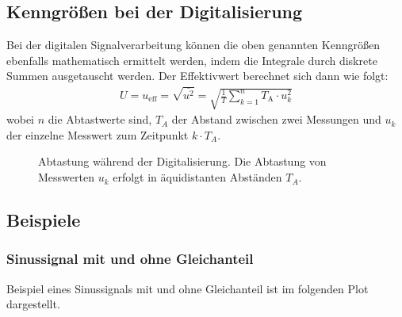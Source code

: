 \documentclass[letterpaper,10pt,english]{jupyterBook}
\let\sphinxpxdimen\pdfpxdimen\else\newdimen\sphinxpxdimen
\begin{document}
\subsection{Kenngrößen bei der Digitalisierung}
\label{\detokenize{content/3_Kenngroessen:kenngroszen-bei-der-digitalisierung}}
\sphinxAtStartPar
Bei der digitalen Signalverarbeitung können die oben genannten Kenngrößen ebenfalls mathematisch ermittelt werden, indem die Integrale durch diskrete Summen ausgetauscht werden. Der Effektivwert berechnet sich dann wie folgt:
\begin{equation*}
\begin{split}U = u_\mathrm{eff} = \sqrt{\overline{u^2}} = \sqrt{\frac{1}{T}\sum_{k = 1}^{n}T_\mathrm A \cdot  u_k^2}\end{split}
\end{equation*}
\sphinxAtStartPar
wobei \(n\) die Abtastwerte sind, \(T_A\) der Abstand zwischen zwei Messungen und \(u_k\) der einzelne Messwert zum Zeitpunkt \(k\cdot T_A\).

\begin{figure}[htbp]
\centering
\capstart

\noindent\sphinxincludegraphics[width=400\sphinxpxdimen]{{abtastung}.jpg}
\caption{Abtastung während der Digitalisierung. Die Abtastung von Messwerten \(u_k\) erfolgt in äquidistanten Abständen \(T_A\).}\label{\detokenize{content/3_Kenngroessen:abtastung}}\end{figure}


\subsection{Beispiele}
\label{\detokenize{content/3_Kenngroessen:beispiele}}

\subsubsection{Sinussignal mit und ohne Gleichanteil}
\label{\detokenize{content/3_Kenngroessen:sinussignal-mit-und-ohne-gleichanteil}}
\sphinxAtStartPar
Beispiel eines Sinussignals mit und ohne Gleichanteil ist im folgenden Plot dargestellt.
\end{document}
